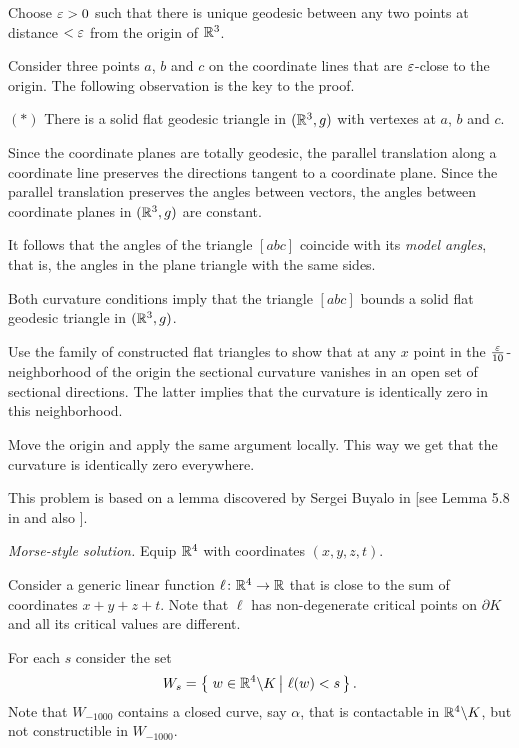 Choose $\varepsilon>0$ such that there is unique geodesic between any two points at distance $<\varepsilon$ from the origin of $\mathbb{R}^3$.

Consider three points $a$, $b$ and $c$ on the coordinate lines that are $\varepsilon$-close 
to the origin.
The following observation is the key to the proof.

\begin{cl}{$({*})$}
There is a solid flat geodesic triangle in $(\mathbb{R}^3,g)$ with vertexes at $a$, $b$ and $c$.
\end{cl}

Since the coordinate planes are totally geodesic, 
the parallel translation along a coordinate line preserves the directions tangent to a coordinate plane.
Since the parallel translation preserves the angles between vectors, the angles between coordinate planes in $(\mathbb{R}^3,g)$ are constant.

It follows that the angles of the triangle $[abc]$ coincide with its \emph{model angles},
that is, the angles in the plane triangle with the same sides.

Both curvature conditions imply that the triangle $[abc]$ bounds a solid flat geodesic triangle in   $(\mathbb{R}^3,g)$.

Use the family of constructed flat triangles 
to show that at any $x$ point in the $\tfrac{\varepsilon}{10}$-neighborhood of the origin
the sectional curvature 
vanishes in an open set of sectional directions.
The latter implies that the curvature is identically zero 
in this neighborhood.

Move the origin and apply the same argument locally.
This way we get that the curvature is identically zero everywhere.
\qeds

This problem is based on a lemma discovered by Sergei Buyalo in [see Lemma 5.8 in  and also ].

\textit{Morse-style solution.}
Equip $\mathbb{R}^4$ with coordinates $(x,y,z,t)$.

Consider a generic linear function $\ell\colon\mathbb{R}^4\to\mathbb{R}$ that is close to the sum of coordinates $x+y+z+t$.
Note that $\ell$
has non-degenerate critical points on $\partial K$ and all its critical values are different.

For each $s$ consider the set 
$$W_s=\set{w\in \RR^4\backslash K}{\ell(w)<s}.$$
Note that $W_{-1000}$ contains a closed curve, say $\alpha$, that is contactable in $\mathbb{R}^4\backslash K$, but not constructible in $W_{-1000}$.

